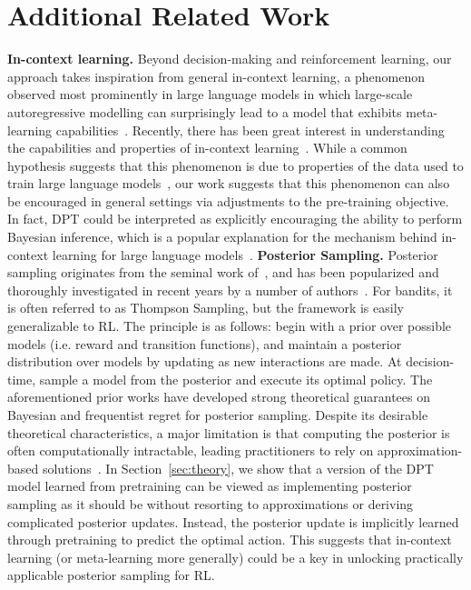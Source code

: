 \documentclass{article}
\begin{document}
\section*{Additional Related Work}
\textbf{In-context learning.} Beyond decision-making and reinforcement learning, our approach takes inspiration from general in-context learning, a phenomenon observed most prominently in large language models in which large-scale autoregressive modelling can surprisingly lead to a model that exhibits meta-learning capabilities~\citep{brown2020language}. Recently, there has been great interest in understanding the capabilities and properties of in-context learning~\citep{garg2022can,von2022transformers,razeghi2022impact,olsson2022context,kirsch2022general,shin2022effect,li2023transformers,wies2023learnability,akyurek2022learning,abernethy2023mechanism}. While a common hypothesis suggests that this phenomenon is due to properties of the data used to train large language models~\citep{chan2022data}, our work suggests that this phenomenon can also be encouraged in general settings via adjustments to the pre-training objective. In fact, DPT could be interpreted as explicitly encouraging the ability to perform Bayesian inference, which is a popular explanation for the mechanism behind in-context learning for large language models~\citep{xie2021explanation}.
\textbf{Posterior Sampling.}  Posterior sampling originates from the seminal work of~\cite{thompson1933likelihood}, and has been popularized and thoroughly investigated in recent years by a number of authors~\cite{russo2018tutorial,agrawal2017near,strens2000bayesian,osband2013more,agrawal2017optimistic,russo2014learning}. For bandits, it is often referred to as Thompson Sampling, but the framework is easily generalizable to RL. The principle is as follows: begin with a prior over possible models (i.e. reward and transition functions), and maintain a posterior distribution over models by updating as new interactions are made. At decision-time, sample a model from the posterior and execute its optimal policy. The aforementioned prior works have developed strong theoretical guarantees on Bayesian and frequentist regret for posterior sampling. Despite its desirable theoretical characteristics, a major limitation is that computing the posterior is often computationally intractable, leading practitioners to rely on approximation-based solutions~\citep{lu2017ensemble,osband2016deep,osband2018randomized}.
In Section~\ref{sec:theory}, we show that a version of the DPT model learned from pretraining can be viewed as implementing posterior sampling as it should be without resorting to approximations or deriving complicated posterior updates. Instead, the posterior update is implicitly learned through pretraining to predict the optimal action. This suggests that in-context learning (or meta-learning more generally) could be a key in unlocking practically applicable posterior sampling for RL.
\end{document}
